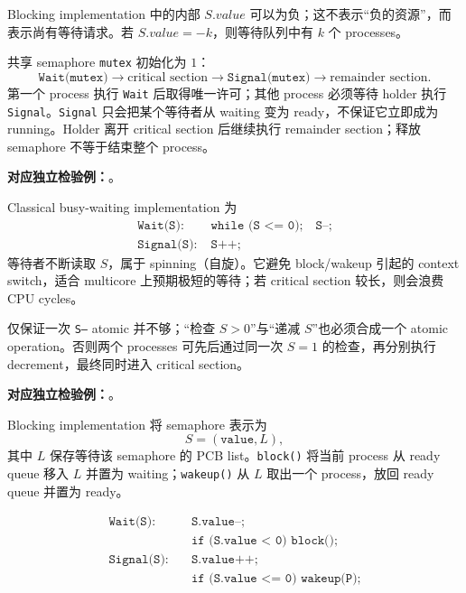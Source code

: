 Blocking implementation 中的内部 $S.value$ 可以为负；这不表示“负的资源”，而表示尚有等待请求。若 $S.value=-k$，则等待队列中有 $k$ 个 processes。


共享 semaphore \texttt{mutex} 初始化为 $1$：
\[
  \texttt{Wait(mutex)}\rightarrow
  \text{critical section}\rightarrow
  \texttt{Signal(mutex)}\rightarrow
  \text{remainder section}.
\]
第一个 process 执行 \texttt{Wait} 后取得唯一许可；其他 process 必须等待 holder 执行 \texttt{Signal}。\texttt{Signal} 只会把某个等待者从 waiting 变为 ready，不保证它立即成为 running。Holder 离开 critical section 后继续执行 remainder section；释放 semaphore 不等于结束整个 process。

\textbf{对应独立检验例：}。


Classical busy-waiting implementation 为
\[
\begin{aligned}
  \texttt{Wait(S):}\;&\texttt{while (S <= 0);}\quad \texttt{S--;}\\
  \texttt{Signal(S):}\;&\texttt{S++;}
\end{aligned}
\]
等待者不断读取 $S$，属于 spinning（自旋）。它避免 block/wakeup 引起的 context switch，适合 multicore 上预期极短的等待；若 critical section 较长，则会浪费 CPU cycles。

仅保证一次 \texttt{S--} atomic 并不够；“检查 $S>0$”与“递减 $S$”也必须合成一个 atomic operation。否则两个 processes 可先后通过同一次 $S=1$ 的检查，再分别执行 decrement，最终同时进入 critical section。

\textbf{对应独立检验例：}。


Blocking implementation 将 semaphore 表示为
\[
  S=(\texttt{value},L),
\]
其中 $L$ 保存等待该 semaphore 的 PCB list。\texttt{block()} 将当前 process 从 ready queue 移入 $L$ 并置为 waiting；\texttt{wakeup()} 从 $L$ 取出一个 process，放回 ready queue 并置为 ready。

\[
\begin{aligned}
  \texttt{Wait(S):}\quad
    &\texttt{S.value--;}\\[-0.2em]
    &\texttt{if (S.value < 0) block();}\\[0.35em]
  \texttt{Signal(S):}\quad
    &\texttt{S.value++;}\\[-0.2em]
    &\texttt{if (S.value <= 0) wakeup(P);}
\end{aligned}
\]

